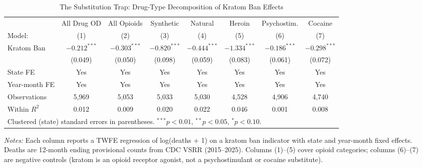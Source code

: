 \begin{table}[htbp]
   \caption{The Substitution Trap: Drug-Type Decomposition of Kratom Ban Effects}
   \label{tab:main}
   \centering
   \begin{adjustbox}{max width=\textwidth}
   \begin{tabular}{lccccccc}
      \toprule
                             & All Drug OD     & All Opioids     & Synthetic       & Natural         & Heroin         & Psychostim.      & Cocaine \\
      Model:               & (1)             & (2)             & (3)             & (4)             & (5)            & (6)              & (7)\\
      \midrule
      Kratom Ban           & $-0.212^{***}$ & $-0.303^{***}$ & $-0.820^{***}$ & $-0.444^{***}$ & $-1.334^{***}$ & $-0.186^{***}$  & $-0.298^{***}$\\
                           & (0.049)        & (0.050)        & (0.098)        & (0.059)        & (0.083)       & (0.061)         & (0.072)\\
      \midrule
      State FE            & Yes             & Yes             & Yes             & Yes             & Yes            & Yes              & Yes\\
      Year-month FE        & Yes             & Yes             & Yes             & Yes             & Yes            & Yes              & Yes\\
      \midrule
      Observations         & 5,969           & 5,053           & 5,033           & 5,030           & 4,528          & 4,906            & 4,740\\
      Within $R^2$         & 0.012         & 0.009         & 0.020         & 0.022         & 0.046        & 0.001          & 0.008\\
      \bottomrule
      \multicolumn{8}{l}{\footnotesize Clustered (state) standard errors in parentheses. $^{***}p<0.01$, $^{**}p<0.05$, $^{*}p<0.10$.}\\
   \end{tabular}
   \end{adjustbox}

   \par\vspace{0.3em}
   {\footnotesize \textit{Notes:} Each column reports a TWFE regression of log(deaths + 1) on a kratom ban indicator with state and year-month fixed effects. Deaths are 12-month ending provisional counts from CDC VSRR (2015--2025). Columns (1)--(5) cover opioid categories; columns (6)--(7) are negative controls (kratom is an opioid receptor agonist, not a psychostimulant or cocaine substitute).}
\end{table}
